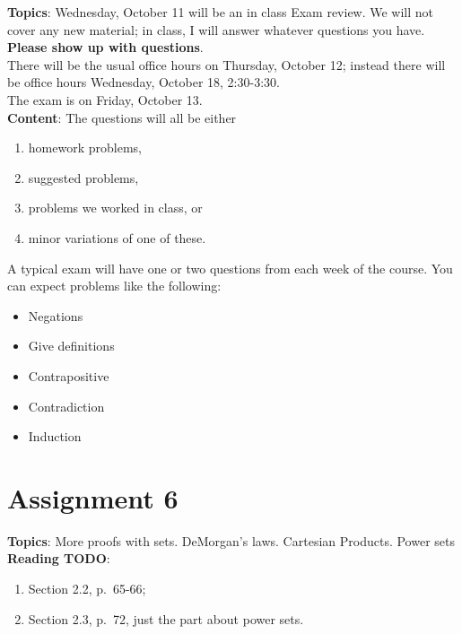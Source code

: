 \documentclass[12pt]{article}
\begin{document}
\textbf{Topics}: Wednesday, October 11 will be an in class Exam review. We will not cover any new material; in class, I will answer whatever questions you have. \textbf{Please show up with questions}.
\\
There will be the usual office hours on Thursday, October 12; instead there will be office hours Wednesday, October 18, 2:30-3:30.
\\

The exam is on Friday, October 13.
\\

\noindent \textbf{Content}: The questions will all be either
\begin{enumerate}
\item homework problems,
\item suggested problems,
\item problems we worked in class, or
\item minor variations of one of these.
\end{enumerate}


A typical exam will have one or two questions from each week of the course. You can expect problems like the following:
\begin{itemize}
\item Negations
\item Give definitions
\item Contrapositive  
\item Contradiction
\item Induction
\end{itemize}

\newpage
\section[6 (due \csname dateWeek6\endcsname): More sets. DeMorgan's laws. Cartesian Products. Power sets.]{Assignment 6}

\noindent \textbf{Topics}: More proofs with sets. DeMorgan's laws. Cartesian Products. Power sets
\\

\noindent \textbf{Reading TODO}:
\begin{enumerate}
\item Section 2.2, p.~65-66; 
\item Section 2.3, p.~72, just the part about
 power sets.
\end{enumerate}
\end{document}
